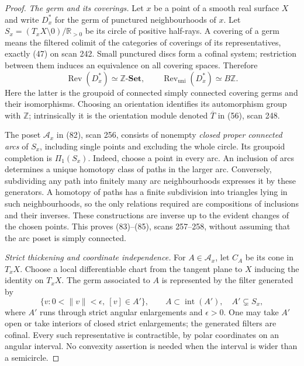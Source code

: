 \begin{proof}
\emph{The germ and its coverings.}
Let $x$ be a point of a smooth real surface $X$ and write
$D_x^*$ for the germ of punctured neighbourhoods of $x$.
Let $S_x=(T_xX\setminus0)/\mathbb R_{>0}$ be its circle of positive
half-rays. A covering of a germ means the filtered colimit of the
categories of coverings of its representatives, exactly (47) on scan
242. Small punctured discs form a cofinal system; restriction between
them induces an equivalence on all covering spaces. Therefore
\[
 \operatorname{Rev}(D_x^*)\simeq\mathbb Z\text{-}\mathbf{Set},
 \qquad \operatorname{Rev}_{\mathrm{uni}}(D_x^*)\simeq B\mathbb Z.
 \tag{F48.1}
\]
Here the latter is the groupoid of connected simply connected covering
germs and their isomorphisms. Choosing an orientation identifies its
automorphism group with $\mathbb Z$; intrinsically it is the orientation
module denoted $\overline T$ in (56), scan 248.

The poset $\mathcal A_x$ in (82), scan 256, consists of nonempty
\emph{closed proper connected arcs} of $S_x$, including single points
and excluding the whole circle. Its groupoid completion is
$\Pi_1(S_x)$. Indeed, choose a point in every arc. An inclusion of
arcs determines a unique homotopy class of paths in the larger arc.
Conversely, subdividing any path into finitely many arc neighbourhoods
expresses it by these generators. A homotopy of paths has a finite
subdivision into triangles lying in such neighbourhoods, so the only
relations required are compositions of inclusions and their inverses.
These constructions are inverse up to the evident changes of the
chosen points. This proves (83)--(85), scans 257--258, without assuming
that the arc poset is simply connected.

\emph{Strict thickening and coordinate independence.}
For $A\in\mathcal A_x$, let $C_A$ be its cone in $T_xX$. Choose a
local differentiable chart from the tangent plane to $X$ inducing the
identity on $T_xX$. The germ associated to $A$ is represented by the
filter generated by
\[
  \{v:0<\lVert v\rVert<\epsilon,\ [v]\in A'\},
  \qquad A\subset\operatorname{int}(A'),\quad A'\subsetneq S_x,
 \tag{F48.2}
\]
where $A'$ runs through strict angular enlargements and $\epsilon>0$.
One may take $A'$ open or take interiors of closed strict enlargements;
the generated filters are cofinal. Every such representative is
contractible, by polar coordinates on an angular interval. No
convexity assertion is needed when the interval is wider than a
semicircle.


\end{proof}
